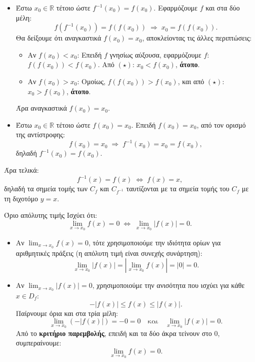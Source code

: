 \begin{itemize}
  \item[$(\Rightarrow)$] Έστω $x_0 \in \mathbb{R}$ τέτοιο ώστε $f^{-1}(x_0) = f(x_0)$.
  Εφαρμόζουμε $f$ και στα δύο μέλη:
  \[
    f\!\left(f^{-1}(x_0)\right) = f\!\left(f(x_0)\right)
    \;\Rightarrow\; x_0 = f\!\left(f(x_0)\right). \tag{$\star$}
  \]
  Θα δείξουμε ότι αναγκαστικά $f(x_0) = x_0$, αποκλείοντας τις άλλες περιπτώσεις:
  \begin{itemize}
    \item Αν $f(x_0) < x_0$: Επειδή $f$ γνησίως αύξουσα, εφαρμόζουμε $f$:
          $f\!\left(f(x_0)\right) < f(x_0)$.
          Από $(\star)$: $x_0 < f(x_0)$, \textbf{άτοπο}.
    \item Αν $f(x_0) > x_0$: Ομοίως,
          $f\!\left(f(x_0)\right) > f(x_0)$,
          και από $(\star)$: $x_0 > f(x_0)$, \textbf{άτοπο}.
  \end{itemize}
  Άρα αναγκαστικά $f(x_0) = x_0$.

  \item[$(\Leftarrow)$] Έστω $x_0 \in \mathbb{R}$ τέτοιο ώστε $f(x_0) = x_0$.
  Επειδή $f(x_0) = x_0$, από τον ορισμό της αντίστροφης:
  \[
    f(x_0) = x_0 \;\Rightarrow\; f^{-1}(x_0) = x_0 = f(x_0),
  \]
  δηλαδή $f^{-1}(x_0) = f(x_0)$.
\end{itemize}

Άρα τελικά:
\[
  f^{-1}(x) = f(x) \;\Leftrightarrow\; f(x) = x,
\]
δηλαδή τα σημεία τομής των $C_f$ και $C_{f^{-1}}$ ταυτίζονται με τα σημεία τομής του $C_f$
με τη διχοτόμο $y = x$.


\begin{Protashmabox}{Όριο απόλυτης τιμής}
Ισχύει ότι:
\[
  \lim_{x \to x_0} f(x) = 0 \;\Leftrightarrow\; \lim_{x \to x_0} |f(x)| = 0.
\]
\end{Protashmabox}
\apodeixi

\begin{itemize}
  \item[$(\Rightarrow)$] Αν $\displaystyle\lim_{x \to x_0} f(x) = 0$, τότε χρησιμοποιούμε
  την ιδιότητα ορίων για αριθμητικές πράξεις (η απόλυτη τιμή είναι συνεχής συνάρτηση):
  \[
    \lim_{x \to x_0} |f(x)| = \left|\lim_{x \to x_0} f(x)\right| = |0| = 0.
  \]

  \item[$(\Leftarrow)$] Αν $\displaystyle\lim_{x \to x_0} |f(x)| = 0$, χρησιμοποιούμε
  την ανισότητα που ισχύει για κάθε $x \in D_f$:
  \[
    -|f(x)| \leq f(x) \leq |f(x)|.
  \]
  Παίρνουμε όρια και στα τρία μέλη:
  \[
    \lim_{x \to x_0}\!\left(-|f(x)|\right) = -0 = 0
    \quad \text{και} \quad
    \lim_{x \to x_0} |f(x)| = 0.
  \]
  Από το \textbf{κριτήριο παρεμβολής}, επειδή και τα δύο άκρα τείνουν στο $0$, συμπεραίνουμε:
  \[
    \lim_{x \to x_0} f(x) = 0.
  \]
\end{itemize}


